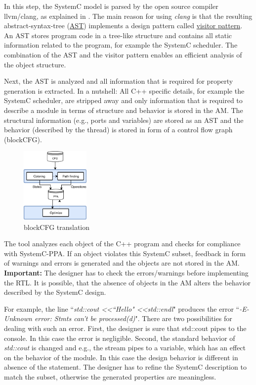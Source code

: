 In this step, the SystemC model is parsed by the open source compiler llvm/clang, as explained in \cite{2013-KaushikPatel}.
The main reason for using \textit{clang} is that the resulting abstract-syntax-tree (\href{https://en.wikipedia.org/wiki/Abstract_syntax_tree}{AST}) implements a design pattern called \href{https://en.wikipedia.org/wiki/Visitor_pattern}{visitor pattern}. 
An AST stores program code in a tree-like structure and contains all static information related to the program, for example the SystemC scheduler.
The combination of the AST and the visitor pattern enables an efficient analysis of the object structure.

Next, the AST is analyzed and all information that is required for property generation is extracted. 
In a nutshell: All C++ specific details, for example the SystemC scheduler, are stripped away and only information that is required to describe a module in terms of structure and behavior is stored in the AM. 
The structural information (e.g., ports and variables) are stored as an AST and the behavior (described by the thread) is stored in form of a control flow graph (blockCFG).

\begin{figure}
	\vspace{-10pt}
    \caption{blockCFG translation}
    \label{fig:step2-detail}
    \includegraphics[width=0.3\textwidth]{fig/step2_detail}
    \vspace{-20pt}
\end{figure}

The tool analyzes each object of the C++ program and checks for compliance with SystemC-PPA. 
If an object violates this SystemC subset, feedback in form of warnings and errors is generated and the objects are not stored in the AM.
\textbf{Important:} The designer has to check the errors/warnings before implementing the RTL.
It is possible, that the absence of objects in the AM alters the behavior described by the SystemC design. 

For example, the line ``\textit{std::cout \textless\textless ``Hello" \textless\textless std::endl}" produces the error ``\textit{-E- Unknown error: Stmts can't be processed(d)}". 
There are two possibilities for dealing with such an error. 
First, the designer is sure that std::cout pipes to the console. 
In this case the error is negligible. 
Second, the standard behavior of \textit{std::cout} is changed and e.g., the stream pipes to a variable, which has an effect on the behavior of the module. 
In this case the design behavior is different in absence of the statement. 
The designer has to refine the SystemC description to match the subset, otherwise the generated properties are meaningless. 

